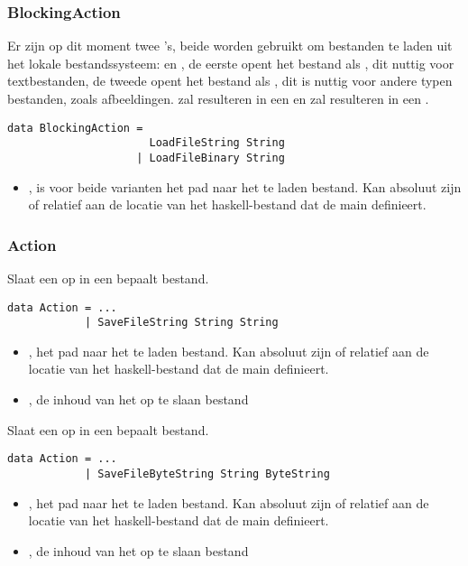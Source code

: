 \subsubsection{BlockingAction}
Er zijn op dit moment twee 's, beide worden gebruikt om bestanden te laden uit het lokale bestandssysteem:  en , de eerste opent het bestand als , dit nuttig voor textbestanden, de tweede opent het bestand als , dit is nuttig voor andere typen bestanden, zoals afbeeldingen.  zal resulteren in een  en  zal resulteren in een .
\begin{lstlisting}
data BlockingAction = 
					  LoadFileString String
					| LoadFileBinary String
\end{lstlisting}
\begin{itemize}
	\item {}, is voor beide varianten het pad naar het te laden bestand. Kan absoluut zijn of relatief aan de locatie van het haskell-bestand dat de main definieert.
\end{itemize}

\subsubsection{Action}
Slaat een  op in een bepaalt bestand.
\begin{lstlisting}
data Action = ...
			| SaveFileString String String
\end{lstlisting}
\begin{itemize}
	\item {}, het pad naar het te laden bestand. Kan absoluut zijn of relatief aan de locatie van het haskell-bestand dat de main definieert.
	\item {}, de inhoud van het op te slaan bestand
\end{itemize}

Slaat een  op in een bepaalt bestand.
\begin{lstlisting}
data Action = ...
			| SaveFileByteString String ByteString
\end{lstlisting}
\begin{itemize}
	\item {}, het pad naar het te laden bestand. Kan absoluut zijn of relatief aan de locatie van het haskell-bestand dat de main definieert.
	\item {}, de inhoud van het op te slaan bestand
\end{itemize}

